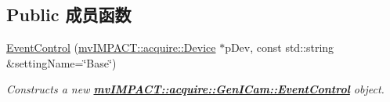 \subsection*{Public 成员函数}
\begin{DoxyCompactItemize}
\item 
\hyperlink{classmv_i_m_p_a_c_t_1_1acquire_1_1_gen_i_cam_1_1_event_control_a789fa270416fde1fb37b359c8264c9a8}{Event\+Control} (\hyperlink{classmv_i_m_p_a_c_t_1_1acquire_1_1_device}{mv\+I\+M\+P\+A\+C\+T\+::acquire\+::\+Device} $\ast$p\+Dev, const std\+::string \&setting\+Name=\char`\"{}Base\char`\"{})
\begin{DoxyCompactList}\small\item\em Constructs a new {\bfseries \hyperlink{classmv_i_m_p_a_c_t_1_1acquire_1_1_gen_i_cam_1_1_event_control}{mv\+I\+M\+P\+A\+C\+T\+::acquire\+::\+Gen\+I\+Cam\+::\+Event\+Control}} object. \end{DoxyCompactList}\end{DoxyCompactItemize}
